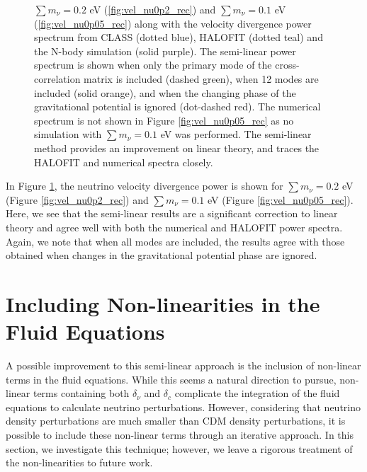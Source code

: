 \documentclass{aastex}
\newcommand{\halofit}{HALOFIT }
\begin{document}
\begin{figure}[h!]
{     $\textstyle\sum m_\nu = 0.2$ eV (\ref{fig:vel_nu0p2_rec}) and $\textstyle\sum
     m_\nu = 0.1$ eV (\ref{fig:vel_nu0p05_rec}) along with the
     velocity  divergence
      power spectrum from CLASS (dotted blue), \halofit (dotted teal) and the N-body
      simulation (solid purple).  The semi-linear power spectrum is
      shown when only the primary mode of the
      cross-correlation matrix is included (dashed green), 
      when 12 modes are included (solid orange), and when the
      changing phase of the gravitational potential is ignored
      (dot-dashed red).  The numerical spectrum is not shown in Figure
      \ref{fig:vel_nu0p05_rec} as no simulation with $\textstyle\sum
      m_\nu = 0.1$ eV was performed.  
      The semi-linear method provides
      an improvement on linear theory, and traces the \halofit and
      numerical spectra closely.  
}
    \label{fig:vel_nu_rec}
\end{figure}

In Figure \ref{fig:vel_nu_rec}, the neutrino velocity divergence power
is shown 
for $\sum m_\nu = 0.2$ eV (Figure \ref{fig:vel_nu0p2_rec})
and $\sum m_\nu = 0.1$ eV (Figure \ref{fig:vel_nu0p05_rec}). 
Here,
we see that the semi-linear results are a significant correction to
linear theory and agree well with both the numerical and
\halofit power spectra.  
Again, we note that when all modes are
included, the results agree with those obtained
when changes in the gravitational potential phase are ignored.

\section{ Including Non-linearities in the Fluid Equations}
\label{sec:Nonlinear}
A possible improvement to this semi-linear approach 
is the inclusion of non-linear terms in the fluid equations. 
While this seems a natural direction to pursue, 
non-linear terms 
containing both $\delta_\nu$ and $\delta_c$ complicate the
integration of the fluid equations to calculate neutrino perturbations.  However,
considering that neutrino density perturbations are much smaller
than CDM density perturbations, it is possible to include
these non-linear terms through an iterative approach.
In this section, we investigate this technique; %
however, we leave
a rigorous treatment of the non-linearities to future work. 
\end{document}
